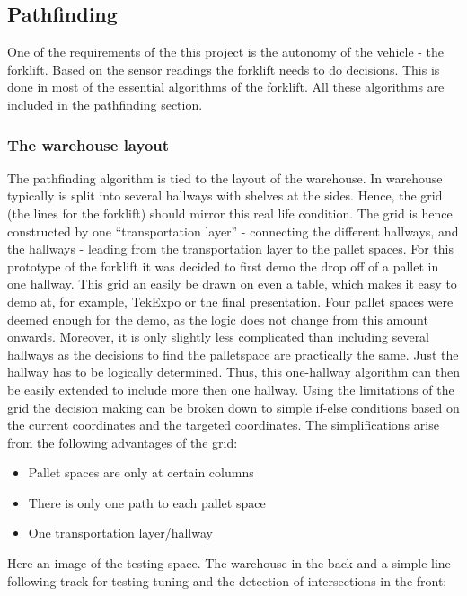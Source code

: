 \documentclass[../report.tex]{subfiles}
\begin{document}
\subsection{Pathfinding}

One of the requirements of the this project is the autonomy of the vehicle - the forklift.
Based on the sensor readings the forklift needs to do decisions. This is done in most of
the essential algorithms of the forklift. All these algorithms are included in the pathfinding section.

\subsubsection{The warehouse layout}

The pathfinding algorithm is tied to the layout of the warehouse.
In warehouse typically is split into several hallways with shelves
at the sides. Hence, the grid (the lines for the forklift) should mirror this
real life condition. The grid is hence constructed 
by one ``transportation layer'' - connecting the different hallways, and the 
hallways - leading from the transportation layer to the pallet spaces. 
For this prototype of the forklift it was decided 
to first demo the drop off of a pallet in one hallway. This grid an easily be 
drawn on even a table, which makes it easy to demo at, for example, TekExpo or 
the final presentation. Four pallet spaces were deemed enough for the demo, as the logic
does not change from this amount onwards.
Moreover, it is only slightly less complicated
than including several hallways as the decisions to find the palletspace are 
practically the same. Just the hallway has to be logically determined. Thus, this one-hallway algorithm
can then be easily extended to include more then one hallway. Using the limitations of
the grid the decision making can be broken down to simple if-else conditions 
based on the current coordinates and the targeted coordinates. The simplifications
arise from the following advantages of the grid:

\begin{itemize}
    \item Pallet spaces are only at certain columns
    \item There is only one path to each pallet space
    \item One transportation layer/hallway
\end{itemize}

Here an image of the testing space. The warehouse in the back and a simple
line following track for testing tuning and the detection of intersections 
in the front:
\end{document}
